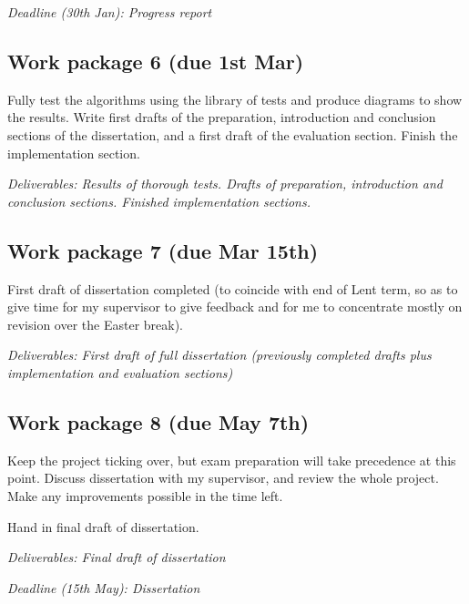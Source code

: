 \documentclass[12pt]{article}
\begin{document}
\emph{Deadline (30th Jan): Progress report}

\subsection*{Work package 6 (due 1st Mar)}
Fully test the algorithms using the library of tests and produce diagrams to show the results. Write first drafts of the preparation, introduction and conclusion sections of the dissertation, and a first draft of the evaluation section. Finish the implementation section.

\emph{Deliverables: Results of thorough tests. Drafts of preparation, introduction and conclusion sections. Finished implementation sections.}

\subsection*{Work package 7 (due Mar 15th)}
First draft of dissertation completed (to coincide with end of Lent term, so as to give time for my supervisor to give feedback and for me to concentrate mostly on revision over the Easter break).

\emph{Deliverables: First draft of full dissertation (previously completed drafts plus implementation and evaluation sections)}

\subsection*{Work package 8 (due May 7th)}
Keep the project ticking over, but exam preparation will take precedence at this point. Discuss dissertation with my supervisor, and review the whole project. Make any improvements possible in the time left.

Hand in final draft of dissertation. 

\emph{Deliverables: Final draft of dissertation}

\emph{Deadline (15th May): Dissertation}
\end{document}
